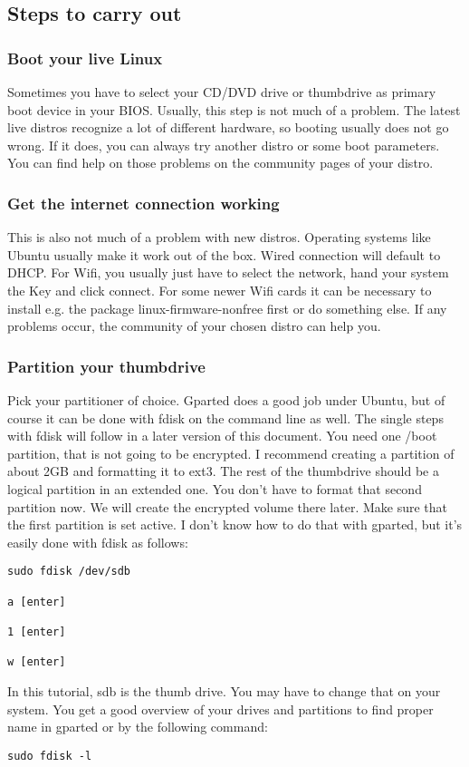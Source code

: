 \documentclass[12pt,a4paper]{article}
\begin{document}
\subsection{Steps to carry out}
\subsubsection{Boot your live Linux}
Sometimes you have to select your CD/DVD drive or thumbdrive as primary boot device in your BIOS. Usually, this step is not much of a problem. The latest live distros recognize a lot of different hardware, so booting usually does not go wrong. If it does, you can always try another distro or some boot parameters. You can find help on those problems on the community pages of your distro.

\subsubsection{Get the internet connection working}
This is also not much of a problem with new distros. Operating systems like Ubuntu usually make it work out of the box. Wired connection will default to DHCP. For Wifi, you usually just have to select the network, hand your system the Key and click connect. For some newer Wifi cards it can be necessary to install e.g. the package linux-firmware-nonfree first or do something else. If any problems occur, the community of your chosen distro can help you.

\subsubsection{Partition your thumbdrive}
Pick your partitioner of choice. Gparted does a good job under Ubuntu, but of course it can be done with fdisk on the command line as well. The single steps with fdisk will follow in a later version of this document. You need one /boot partition, that is not going to be encrypted. I recommend creating a partition of about 2GB and formatting it to ext3. The rest of the thumbdrive should be a logical partition in an extended one. You don't have to format that second partition now. We will create the encrypted volume there later. Make sure that the first partition is set active. I don't know how to do that with gparted, but it's easily done with fdisk as follows:
\begin{Verbatim}[commandchars=\\\{\}]
sudo fdisk /dev/sdb

a [enter]

1 [enter]

w [enter]

\end{Verbatim}
In this tutorial, sdb is the thumb drive. You may have to change that on your system. You get a good overview of your drives and partitions to find proper name in gparted or by the following command:
\begin{Verbatim}[commandchars=\\\{\}]
sudo fdisk -l
\end{Verbatim}
\end{document}
